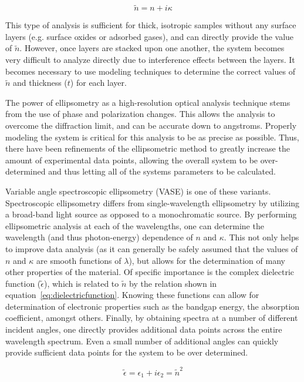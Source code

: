 \begin{equation}
 \label{eq:complexindex}
 \displaystyle
	\tilde{n} = n + i\kappa
\end{equation}

This type of analysis is sufficient for thick, isotropic samples without any surface layers (e.g. surface oxides or adsorbed gases), and can directly provide the value of $\tilde{n}$. However, once layers are stacked upon one another, the system becomes very difficult to analyze directly due to interference effects between the layers. It becomes necessary to use modeling techniques to determine the correct values of $\tilde{n}$ and thickness ($t$) for each layer. 

The power of ellipsometry as a high-resolution optical analysis technique stems from the use of phase and polarization changes. This allows the analysis to overcome the diffraction limit, and can be accurate down to angstroms. Properly modeling the system is critical for this analysis to be as precise as possible. Thus, there have been refinements of the ellipsometric method to greatly increase the amount of experimental data points, allowing the overall system to be over-determined and thus letting all of the systems parameters to be calculated. 
	
Variable angle spectroscopic ellipsometry (VASE) is one of these variants. Spectroscopic ellipsometry differs from single-wavelength ellipsometry by utilizing a broad-band light source as opposed to a monochromatic source. By performing ellipsometric analysis at each of the wavelengths, one can determine the wavelength (and thus photon-energy) dependence of $n$ and $\kappa$. This not only helps to improve data analysis (as it can generally be safely assumed that the values of $n$ and $\kappa$ are smooth functions of $\lambda$), but allows for the determination of many other properties of the material. Of specific importance is the complex dielectric function ($\tilde{\epsilon}$), which is related to $\tilde{n}$ by the relation shown in equation~\vref{eq:dielectricfunction}. Knowing these functions can allow for determination of electronic properties such as the bandgap energy, the absorption coefficient, amongst others. Finally, by obtaining spectra at a number of different incident angles, one directly provides additional data points across the entire wavelength spectrum. Even a small number of additional angles can quickly provide sufficient data points for the system to be over determined. 

\begin{equation}
 \label{eq:dielectricfunction}
 \displaystyle
	\tilde{\epsilon} = \epsilon_{1} + i\epsilon_{2} = \tilde{n}^{2}
\end{equation}

